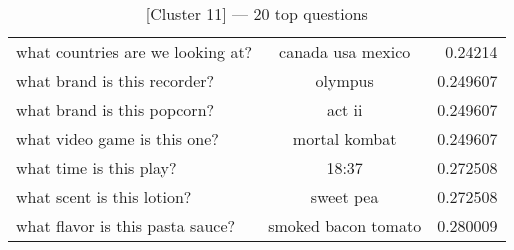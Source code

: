 \begin{table}[!th]
{\begin{tabular}{lcr}
			what countries are we looking at?   & canada usa mexico    & 0.24214           \\
			what brand is this recorder?        & olympus              & 0.249607          \\
			what brand is this popcorn?         & act ii               & 0.249607          \\
			what video game is this one?        & mortal kombat        & 0.249607          \\
			what time is this play?             & 18:37                & 0.272508          \\
			what scent is this lotion?          & sweet pea            & 0.272508          \\
			what flavor is this pasta sauce?    & smoked bacon tomato  & 0.280009          \\
			\bottomrule
		\end{tabular}}
	\caption{[Cluster 11] --- 20 top questions}
	\vspace{-5mm}
\end{table}

